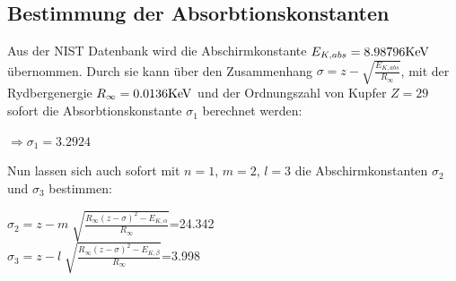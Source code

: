   \subsection{Bestimmung der Absorbtionskonstanten}
  Aus der NIST Datenbank wird die Abschirmkonstante $E_{K,abs}=  8.98796\si[]{KeV}$\\ übernommen. Durch sie kann
  über den Zusammenhang $\sigma=z-\sqrt{\frac{E_{K,abs}}{R_\infty}}$, mit der Rydbergenergie $R_\infty=0.0136\si[]{KeV}$
  und der Ordnungszahl von Kupfer $Z=29$ sofort die Absorbtionskonstante $\sigma_1$ berechnet werden:
  \begin{center}
    $\Rightarrow \sigma_1=3.2924$
  \end{center}
  Nun lassen sich auch sofort mit $n=1$, $m=2$, $l=3$ die Abschirmkonstanten $\sigma_2$ und $\sigma_3$ bestimmen:
  \begin{center}
    $\sigma_2=z-m\sqrt[]{\frac{R_{\infty}(z-\sigma)^2-E_{K,\alpha}}{R_{\infty}}}$=24.342\\
    $\sigma_3=z-l\sqrt[]{\frac{R_{\infty}(z-\sigma)^2-E_{K,\beta}}{R_{\infty}}}$=3.998\\
  \end{center}
